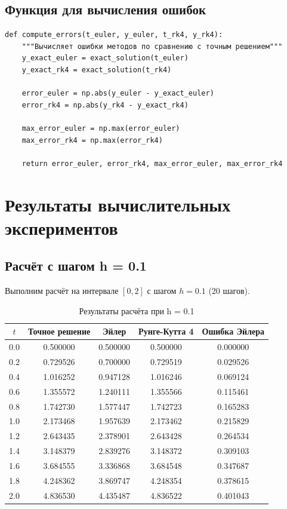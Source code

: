 \documentclass[a4paper,12pt]{article}
\begin{document}
\subsection{Функция для вычисления ошибок}

\begin{verbatim}
def compute_errors(t_euler, y_euler, t_rk4, y_rk4):
    """Вычисляет ошибки методов по сравнению с точным решением"""
    y_exact_euler = exact_solution(t_euler)
    y_exact_rk4 = exact_solution(t_rk4)
    
    error_euler = np.abs(y_euler - y_exact_euler)
    error_rk4 = np.abs(y_rk4 - y_exact_rk4)
    
    max_error_euler = np.max(error_euler)
    max_error_rk4 = np.max(error_rk4)
    
    return error_euler, error_rk4, max_error_euler, max_error_rk4
\end{verbatim}

\newpage

\section{Результаты вычислительных экспериментов}

\subsection{Расчёт с шагом h = 0.1}

Выполним расчёт на интервале \([0, 2]\) с шагом \(h = 0.1\) (20 шагов).

\begin{table}[H]
\centering
\caption{Результаты расчёта при h = 0.1}
\label{tab:results_h01}
\begin{tabular}{|c|c|c|c|c|}
\hline
\(t\) & \textbf{Точное решение} & \textbf{Эйлер} & \textbf{Рунге-Кутта 4} & \textbf{Ошибка Эйлера} \\ \hline
0.0 & 0.500000 & 0.500000 & 0.500000 & 0.000000 \\
0.2 & 0.729526 & 0.700000 & 0.729519 & 0.029526 \\
0.4 & 1.016252 & 0.947128 & 1.016246 & 0.069124 \\
0.6 & 1.355572 & 1.240111 & 1.355566 & 0.115461 \\
0.8 & 1.742730 & 1.577447 & 1.742723 & 0.165283 \\
1.0 & 2.173468 & 1.957639 & 2.173462 & 0.215829 \\
1.2 & 2.643435 & 2.378901 & 2.643428 & 0.264534 \\
1.4 & 3.148379 & 2.839276 & 3.148372 & 0.309103 \\
1.6 & 3.684555 & 3.336868 & 3.684548 & 0.347687 \\
1.8 & 4.248362 & 3.869747 & 4.248354 & 0.378615 \\
2.0 & 4.836530 & 4.435487 & 4.836522 & 0.401043 \\ \hline
\end{tabular}
\end{table}
\end{document}

